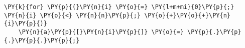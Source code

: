 \begin{Verbatim}[commandchars=\\\{\},codes={\catcode`\$=3\catcode`\^=7\catcode`\_=8}]
\PY{k}{for} \PY{p}{(}\PY{n}{i} \PY{o}{=} \PY{l+m+mi}{0}\PY{p}{;} \PY{n}{i} \PY{o}{<} \PY{n}{n}\PY{p}{;} \PY{o}{+}\PY{o}{+}\PY{n}{i}\PY{p}{)}
    \PY{n}{a}\PY{p}{[}\PY{n}{i}\PY{p}{]} \PY{o}{=} \PY{p}{.}\PY{p}{.}\PY{p}{.}\PY{p}{;}
\end{Verbatim}
